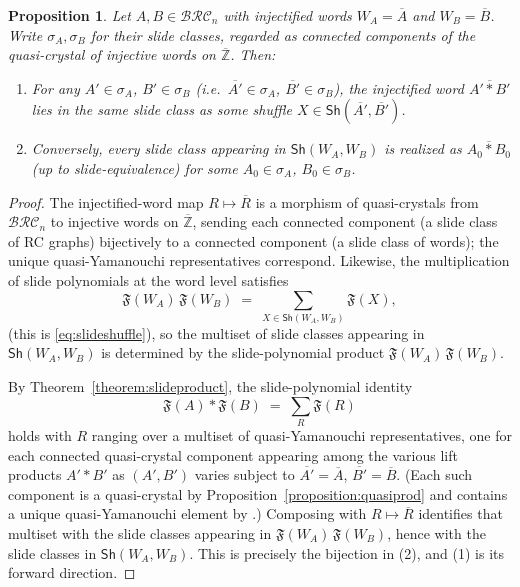 \documentclass{amsart}
\newtheorem{proposition}[lemma]{Proposition}
\theoremstyle{definition}
\theoremstyle{remark}
\numberwithin{equation}{subsection}
\newcommand{\BRC}{\mathcal{BRC}}
\begin{document}
\begin{proposition}\label{proposition:liftshufflewords}
Let $A, B\in\BRC_n$ with injectified words $W_A=\overline{A}$ and $W_B=\overline{B}$. Write $\sigma_A,\sigma_B$ for their slide classes, regarded as connected components of the quasi-crystal of injective words on $\overline{\mathbb{Z}}$. Then:
\begin{enumerate}
\item For any $A'\in\sigma_A$, $B'\in\sigma_B$ (i.e.\ $\overline{A'}\in\sigma_A$, $\overline{B'}\in\sigma_B$), the injectified word $\overline{A'*B'}$ lies in the same slide class as some shuffle $X\in\mathsf{Sh}(\overline{A'},\overline{B'})$.
\item Conversely, every slide class appearing in $\mathsf{Sh}(W_A,W_B)$ is realized as $\overline{A_0*B_0}$ (up to slide-equivalence) for some $A_0\in\sigma_A$, $B_0\in\sigma_B$.
\end{enumerate}
\end{proposition}
\begin{proof}

The injectified-word map $R\mapsto\overline{R}$ is a morphism of quasi-crystals from $\BRC_n$ to injective words on $\overline{\mathbb{Z}}$, sending each connected component (a slide class of RC graphs) bijectively to a connected component (a slide class of words); the unique quasi-Yamanouchi representatives correspond. Likewise, the multiplication of slide polynomials at the word level satisfies
\[
\mathfrak{F}(W_A)\,\mathfrak{F}(W_B)\;=\;\sum_{X\in\mathsf{Sh}(W_A,W_B)}\mathfrak{F}(X),
\]
(this is \eqref{eq:slideshuffle}), so the multiset of slide classes appearing in $\mathsf{Sh}(W_A,W_B)$ is determined by the slide-polynomial product $\mathfrak{F}(W_A)\,\mathfrak{F}(W_B)$.

By Theorem~\ref{theorem:slideproduct}, the slide-polynomial identity
\[
\mathfrak{F}(A)*\mathfrak{F}(B)\;=\;\sum_{R}\mathfrak{F}(R)
\]
holds with $R$ ranging over a multiset of quasi-Yamanouchi representatives, one for each connected quasi-crystal component appearing among the various lift products $A'*B'$ as $(A',B')$ varies subject to $\overline{A'}=\overline{A}$, $\overline{B'}=\overline{B}$. (Each such component is a quasi-crystal by Proposition~\ref{proposition:quasiprod} and contains a unique quasi-Yamanouchi element by \cite[Proposition~4.6]{cain2023quasicrystals}.) Composing with $R\mapsto\overline{R}$ identifies that multiset with the slide classes appearing in $\mathfrak{F}(W_A)\,\mathfrak{F}(W_B)$, hence with the slide classes in $\mathsf{Sh}(W_A,W_B)$. This is precisely the bijection in (2), and (1) is its forward direction.
\end{proof}
\end{document}

